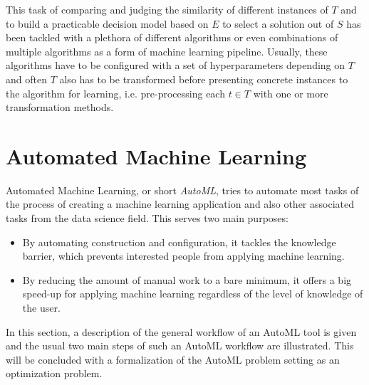 This task of comparing and judging the similarity of different instances of $T$ and to build a practicable decision model based on $E$ to select a solution out of $S$ has been tackled with a plethora of different algorithms or even combinations of multiple algorithms as a form of machine learning pipeline.
Usually, these algorithms have to be configured with a set of hyperparameters depending on $T$ and often $T$ also has to be transformed before presenting concrete instances to the algorithm for learning, i.e. pre-processing each $t\in T$ with one or more transformation methods.

\section{Automated Machine Learning}
\label{sec:theory:automl}
Automated Machine Learning, or short \textit{AutoML}, tries to automate most tasks of the process of creating a machine learning application and also other associated tasks from the data science field.
This serves two main purposes:
\begin{itemize}
    \item By automating construction and configuration, it tackles the knowledge barrier, which prevents interested people from applying machine learning.
    \item By reducing the amount of manual work to a bare minimum, it offers a big speed-up for applying machine learning regardless of the level of knowledge of the user.
\end{itemize}
In this section, a description of the general workflow of an AutoML tool is given and the usual two main steps of such an AutoML workflow are illustrated.
This will be concluded with a formalization of the AutoML problem setting as an optimization problem.

